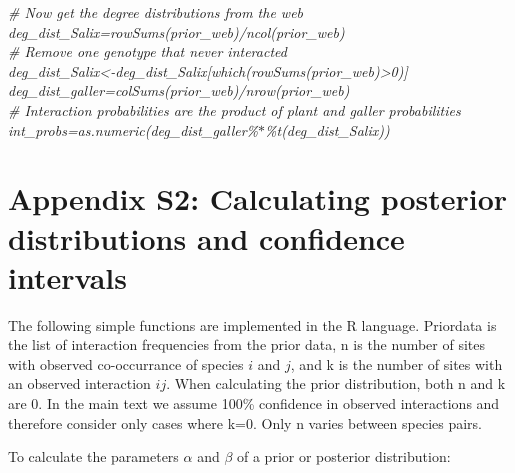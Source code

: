\documentclass[12pt]{article}
\begin{document}
      \vspace{12pt}
      \emph{
      \noindent \hspace{-4pt} \# Now get the degree distributions from the web\\
      deg\_dist\_Salix=rowSums(prior\_web)/ncol(prior\_web)\\
      \# Remove one genotype that never interacted\\
      deg\_dist\_Salix\textless-deg\_dist\_Salix[which(rowSums(prior\_web)\textgreater0)]\\
      deg\_dist\_galler=colSums(prior\_web)/nrow(prior\_web)\\
      \# Interaction probabilities are the product of plant and galler probabilities\\
      int\_probs=as.numeric(deg\_dist\_galler\%$*$\%t(deg\_dist\_Salix))\\
      }


\clearpage


\section*{Appendix S2: Calculating posterior distributions and confidence intervals}

  The following simple functions are implemented in the R language. 
  Priordata is the list of interaction frequencies from the prior 
  data, n is the number of sites with observed co-occurrance of 
  species $i$ and $j$, and k is the number of sites with an 
  observed interaction $ij$. When calculating the prior 
  distribution, both n and k are 0. In the main text we assume 100\%
  confidence in observed interactions and therefore consider only 
  cases where k=0. Only n varies between species pairs.


  To calculate the parameters $\alpha$ and $\beta$ of a prior or 
  posterior distribution:
\end{document}
